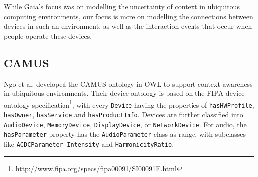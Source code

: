 


While Gaia's focus was on modelling the uncertainty of context in ubiquitous computing environments, our focus is more on modelling the connections between devices in such an environment, as well as the interaction events that occur when people operate these devices.



\subsection{CAMUS}

Ngo et al. \cite{Ngo2004} developed the \ac{CAMUS} ontology in \ac{OWL} to support context awareness in ubiquitous environments. Their device ontology is based on the \ac{FIPA} device ontology specification\footnote{http://www.fipa.org/specs/fipa00091/SI00091E.html}, with every \texttt{Device} having the properties of \texttt{hasHWProfile}, \texttt{hasOwner}, \texttt{has\-Service} and \texttt{hasProductInfo}. Devices are further classified into \texttt{AudioDevice}, \texttt{MemoryDevice}, \texttt{DisplayDevice}, or \texttt{NetworkDevice}. For audio, the \texttt{hasParameter} property has the \texttt{Audio\-Parameter} class as range, with subclasses like \texttt{ACDC\-Parameter}, \texttt{In\-ten\-si\-ty} and \texttt{Harmonicity\-Ratio}. %

